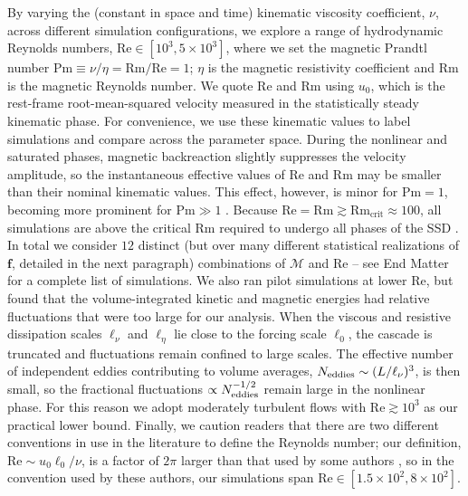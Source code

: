 \documentclass[12pt,twoside]{extreport}
\makeatletter
\newcommand{\mVector}[1]{\bm{#1}} %
\newcommand{\mReh}{\ensuremath{\mathrm{Re}}} %
\newcommand{\mRem}{\ensuremath{\mathrm{Rm}}} %
\newcommand{\mPrm}{\ensuremath{\mathrm{Pm}}} %
\newcommand{\mSonicMach}{\ensuremath{\mathcal{M}}} %
\newcommand{\eg}{e.g.,\xspace} %
\providecommand{\DIFaddtex}[1]{{\protect\color{DIFgreen}\uwave{#1}}} %
\providecommand{\DIFdeltex}[1]{{\protect\color{DIFpurple}\sout{#1}}} %
\providecommand{\DIFaddbegin}{} %
\providecommand{\DIFaddend}{} %
\providecommand{\DIFdelbegin}{} %
\providecommand{\DIFdelend}{} %
\providecommand{\DIFadd}[1]{\texorpdfstring{\DIFaddtex{#1}}{#1}} %
\providecommand{\DIFdel}[1]{\texorpdfstring{\DIFdeltex{#1}}{}} %
\providecommand{\DIFscaledelfig}{0.5}
\newlength{\DIFdelgraphicswidth} %
\newlength{\DIFdelgraphicsheight} %
\providecommand{\DIFaddincludegraphics}[2][]{{\color{DIFgreen}\fbox{\DIFOincludegraphics[#1]{#2}}}} %
\providecommand{\DIFdelincludegraphics}[2][]{%
\sbox{\DIFdelgraphicsbox}{\DIFOincludegraphics[#1]{#2}}%
\settoboxwidth{\DIFdelgraphicswidth}{\DIFdelgraphicsbox} %
\settoboxtotalheight{\DIFdelgraphicsheight}{\DIFdelgraphicsbox} %
\scalebox{\DIFscaledelfig}{%
\parbox[b]{\DIFdelgraphicswidth}{\usebox{\DIFdelgraphicsbox}\\[-\baselineskip] \rule{\DIFdelgraphicswidth}{0em}}\llap{\resizebox{\DIFdelgraphicswidth}{\DIFdelgraphicsheight}{%
\setlength{\unitlength}{\DIFdelgraphicswidth}%
\begin{picture}(1,1)%
\thicklines\linethickness{2pt} %
{\color{DIFpurple}\put(0,0){\framebox(1,1){}}}%
{\color{DIFpurple}\put(0,0){\line( 1,1){1}}}%
{\color{DIFpurple}\put(0,1){\line(1,-1){1}}}%
\end{picture}%
}\hspace*{3pt}}} %
} %
\DeclareRobustCommand{\DIFaddbegin}{\DIFOaddbegin \let\includegraphics\DIFaddincludegraphics} %
\DeclareRobustCommand{\DIFaddend}{\DIFOaddend \let\includegraphics\DIFOincludegraphics} %
\DeclareRobustCommand{\DIFdelbegin}{\DIFOdelbegin \let\includegraphics\DIFdelincludegraphics} %
\DeclareRobustCommand{\DIFdelend}{\DIFOaddend \let\includegraphics\DIFOincludegraphics} %
\let\sout@orig\sout %
\renewcommand{\sout}[1]{\ifmmode\text{\sout@orig{\ensuremath{#1}}}\else\sout@orig{#1}\fi} %
\makeatother
\begin{document}
    By varying the (constant in space and time) kinematic viscosity coefficient, $\nu$, across different simulation configurations, we explore a range of hydrodynamic Reynolds numbers, $\mReh \in [10^3, 5\times 10^3]$, where we set the magnetic Prandtl number $\mPrm \equiv \nu/\eta = \mRem/\mReh = 1$; $\eta$ is the magnetic resistivity coefficient and $\mRem$ is the magnetic Reynolds number. We quote $\mReh$ and $\mRem$ using \DIFdelbegin \DIFdel{$u_0$}\DIFdelend \DIFaddbegin \DIFadd{$u_\mathrm{turb}$}\DIFaddend , which is the rest-frame root-mean-squared velocity measured in the statistically steady kinematic phase. For convenience, we use these kinematic values to label simulations and compare across the parameter space. During the nonlinear and saturated phases, magnetic backreaction slightly suppresses the velocity amplitude, so the instantaneous effective values of $\mReh$ and $\mRem$ may be smaller than their nominal kinematic values. This effect, however, is minor for $\mPrm = 1$, becoming more prominent for $\mPrm \gg 1$ \citep{seta2021saturation, shivakumar2025numerical}. Because $\mReh = \mRem \gtrsim \mRem_\mathrm{crit} \approx 100$, all simulations are above the critical $\mRem$ required to undergo all phases of the SSD \citep{schekochihin2007fluctuation, schober2015saturation, Seta2020_critical_Rm}. In total we consider $12$ distinct (but over many different statistical realizations of $\mVector{f}$, detailed in the next paragraph) combinations of $\mSonicMach$ and $\mReh$ -- see End Matter \DIFaddbegin \DIFadd{(\S\ref{app:ssd-nl:simulation-setup}) }\DIFaddend for a complete list of simulations. We also ran pilot simulations at lower $\mReh$, but found that the volume-integrated kinetic and magnetic energies had relative fluctuations that were too large for our analysis. When the viscous and resistive dissipation scales $\ell_\nu$ and $\ell_\eta$ lie close to the forcing scale \DIFdelbegin \DIFdel{$\ell_0$}\DIFdelend \DIFaddbegin \DIFadd{$\ell_\mathrm{turb}$}\DIFaddend , the cascade is truncated and fluctuations remain confined to large scales. The effective number of independent eddies contributing to volume averages, $N_{\rm eddies} \sim (L/\ell_\nu)^3$, is then small, so the fractional fluctuations $\propto N_{\rm eddies}^{-1/2}$ remain large in the nonlinear phase. For this reason we adopt moderately turbulent flows with $\mReh \gtrsim 10^3$ as our practical lower bound. Finally, we caution readers that there are two different conventions in use in the literature to define the Reynolds number; our definition, \DIFdelbegin \DIFdel{$\mReh \sim u_0 \ell_0 / \nu$}\DIFdelend \DIFaddbegin \DIFadd{$\mReh \sim u_\mathrm{turb} \ell_\mathrm{turb} / \nu$}\DIFaddend , is a factor of $2\pi$ larger than that used by some authors \citep[\eg][]{brandenburg2023dissipative, galishnikova2022tearing}, so in the convention used by these authors, our simulations span $\mReh \in [1.5\times 10^2, 8\times 10^2]$.
\end{document}
